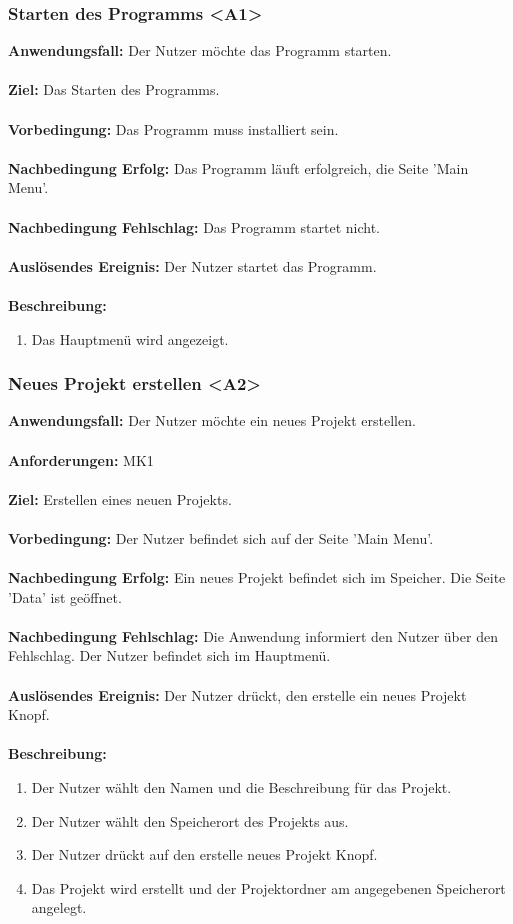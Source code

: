 \documentclass[parskip=full]{scrartcl} %
\begin{document}
\subsubsection*{Starten des Programms <A1>}
\textbf{Anwendungsfall:}  Der Nutzer möchte das Programm starten.\\\\
\textbf{Ziel:} Das Starten des Programms. \\\\
\textbf{Vorbedingung:} Das Programm muss installiert sein.  \\\\
\textbf{Nachbedingung Erfolg:} Das Programm läuft erfolgreich, die Seite 'Main Menu'.\\\\
\textbf{Nachbedingung Fehlschlag:} Das Programm startet nicht. \\\\
\textbf{Auslösendes Ereignis:} Der Nutzer startet das Programm. \\\\
\textbf{Beschreibung:}
\begin{enumerate}
    \item Das Hauptmenü wird angezeigt.
\end{enumerate}
\newpage


\subsubsection*{Neues Projekt erstellen <A2>}
\textbf{Anwendungsfall:} Der Nutzer möchte ein neues Projekt erstellen.\\\\
\textbf{Anforderungen:} MK1\\\\
\textbf{Ziel:} Erstellen eines neuen Projekts. \\\\
\textbf{Vorbedingung:} Der Nutzer befindet sich auf der Seite 'Main Menu'. \\\\
\textbf{Nachbedingung Erfolg:} Ein neues Projekt befindet sich im Speicher. Die Seite 'Data' ist geöffnet.  \\\\
\textbf{Nachbedingung Fehlschlag:} Die Anwendung informiert den Nutzer über den Fehlschlag. Der Nutzer befindet sich im Hauptmenü. \\\\
\textbf{Auslösendes Ereignis:} Der Nutzer drückt, den erstelle ein neues Projekt Knopf. \\\\
\textbf{Beschreibung:}
\begin{enumerate}
    \item Der Nutzer wählt den Namen und die Beschreibung für das Projekt.
    \item Der Nutzer wählt den Speicherort des Projekts aus.
    \item Der Nutzer drückt auf den erstelle neues Projekt Knopf.
    \item Das Projekt wird erstellt und der Projektordner am angegebenen Speicherort angelegt.
\end{enumerate}
\newpage
\end{document}
